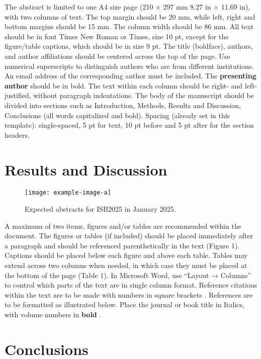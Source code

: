 \documentclass[10pt,twocolumn,a4paper]{article}
\begin{document}
The abstract is limited to one A4 size page (210 × 297 mm 8.27 in × 11.69 in), with two columns of text. The top margin should be 20 mm, while left, right and bottom margins should be 15 mm. The column width should be 86 mm. All text should be in font Times New Roman or Times, size 10 pt, except for the figure/table captions, which should be in size 9
pt. The title (boldface), authors, and author affiliations should be centered across the top of the page. Use numerical superscripts to distinguish authors who are from different institutions. An email address of the corresponding author must be included. The \textbf{presenting author} should be in bold.
The text within each column should be right- and left-justified, without paragraph indentations. The body of the manuscript should be divided into sections such as Introduction, Methods, Results and Discussion, Conclusions (all words capitalized and bold). Spacing (already set in this template): single-spaced, 5 pt for text, 10 pt before and 5
pt after for the section headers.




\section*{Results and Discussion}


\begin{figure}
\texttt{[image: example-image-a]}
\captionsetup{font=small, labelfont=bf}
\caption{Expected abstracts for ISB2025 in January 2025.} 
\label{fig:example}
\end{figure}


A maximum of two items, figures and/or tables are recommended within the document. The figures or tables (if included) should be placed immediately after a paragraph and should be referenced parenthetically in the text (Figure 1). Captions should be placed below each figure and above each table. Tables may extend across two columns when needed, in which case they must be placed at the bottom of the page (Table 1). In Microsoft Word, use “Layout → Columns” to control which parts of the text are in single column format. Reference citations within the text are to be made with numbers in square brackets \cite{BC,PQ}. References are to be formatted as illustrated below. Place the journal or book title in Italics, with volume numbers in \textbf{bold} \cite{BCDE}.

\section*{Conclusions}
\end{document}
